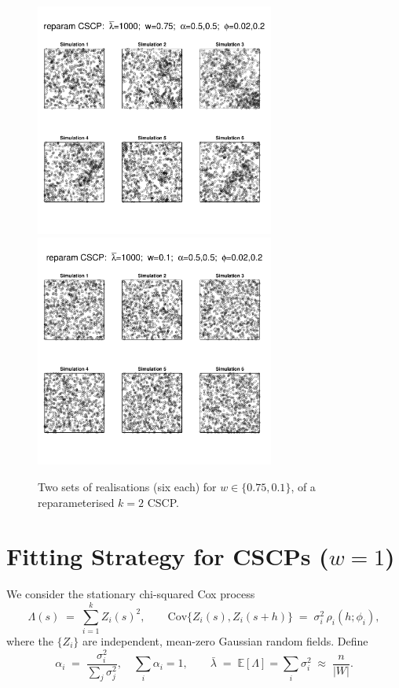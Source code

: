 \documentclass[11pt]{article}
\begin{document}
\begin{figure}
	\includegraphics[width=0.7\textwidth]{fig_repam_wsmaller1.pdf}\\
	\includegraphics[width=0.7\textwidth]{fig_repam_wsmaller2.pdf}\\
	\caption{Two sets of realisations (six each) for $w\in\{0.75,0.1\}$, of a reparameterised $k=2$ CSCP.}\label{fig:repam}
\end{figure}


\section{Fitting Strategy for CSCPs (\(w=1\))}

We consider the stationary chi-squared Cox process
\[
\Lambda(s) \;=\; \sum_{i=1}^k Z_i(s)^2,
\qquad 
\mathrm{Cov}\{Z_i(s),Z_i(s+h)\} \;=\; \sigma_i^2 \,\rho_i(h;\phi_i),
\]
where the $\{Z_i\}$ are independent, mean-zero Gaussian random fields.  
Define
\[
\alpha_i \;=\; \frac{\sigma_i^2}{\sum_j\sigma_j^2}, \quad 
\sum_i \alpha_i = 1, 
\qquad 
\bar\lambda \;=\; \mathbb E[\Lambda] = \sum_i \sigma_i^2 \;\approx\; \frac{n}{|W|}.
\]
\end{document}
